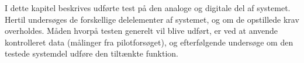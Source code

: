 I dette kapitel beskrives udførte test på den analoge og digitale del af systemet. Hertil undersøges de forskellige delelementer af systemet, og om de opstillede krav overholdes. Måden hvorpå testen generelt vil blive udført, er ved at anvende kontrolleret data (målinger fra pilotforsøget), og efterfølgende undersøge om den testede systemdel udføre den tiltænkte funktion. 

  